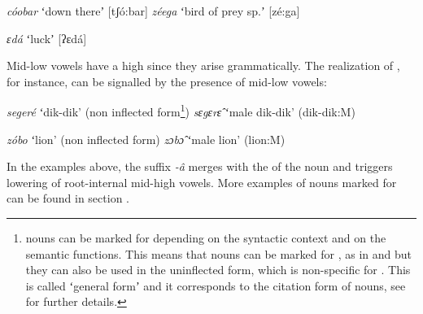 \documentclass[output=paper]{LSP/langsci}
\begin{document}
\begin{exe}
	\ex \begin{xlist} \label{ex:Petrollino:coobar} 
    \ex \textit{cóobar}\hspace{5mm} ʻdown thereʼ\hspace{7mm} [tʃó:bar] 
    \ex \textit{zéega}\hspace{7mm} ʻbird of prey sp.ʼ \hspace{1mm}[zé:ga] 
    \end{xlist}
\end{exe}
    
\begin{exe}
    \ex \textit{ɛdá}\hspace{17mm} ʻluckʼ\hspace{18mm} [ʔɛdá] \label{ex:Petrollino:ɛda}
\end{exe}
Mid-low vowels have a high  since they arise grammatically. The realization of  , for instance, can be signalled by the presence of mid-low vowels:
 \begin{exe}
 	\ex \begin{xlist}
 	\ex \textit{segeré}\hspace{7mm} ʻdik-dik' (non inflected form\footnote{ nouns can be marked for  depending on the syntactic context and on the semantic functions. This means that nouns can be marked for , as in  and  but they can also be used in the uninflected form, which is non-specific for . This is called ʻgeneral formʼ and it corresponds to the citation form of nouns, see \citet{Petrollino2016} for further details.})
    \ex \textit{sɛgɛrɛ̂}\hspace{7mm} ʻmale dik-dik' \label{ex:Petrollino:dikdik} (dik-dik:M)
 	\end{xlist}
 \end{exe}
 
\begin{exe}
 	\ex \begin{xlist}
 	\ex \textit{zóbo}\hspace{10mm} ʻlion' (non inflected form)
    \ex \textit{zɔbɔ̂}\hspace{10mm} ʻmale lion' \label{ex:Petrollino:lion} (lion:M)
 	\end{xlist}
 \end{exe}
In the examples above, the  suffix \textit{-â} merges with the  of the noun and triggers lowering of root-internal mid-high vowels. More examples of nouns marked for   can be found in section .
\end{document}
